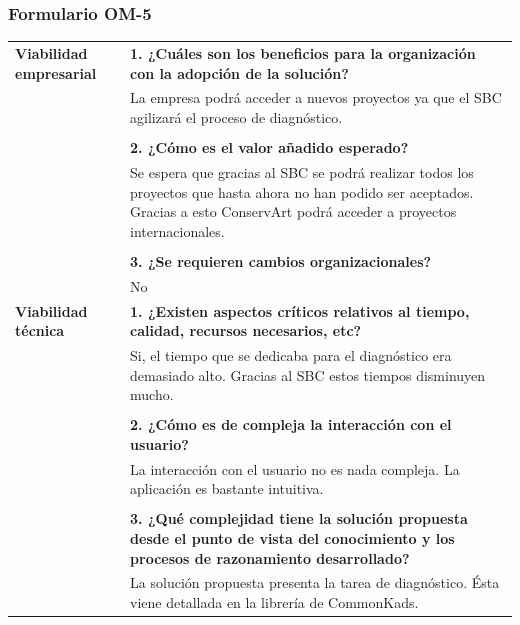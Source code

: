 \documentclass[a4paper,11pt]{article}
\begin{document}
			\subsubsection{Formulario OM-5}
			\begin{center}
				\begin{tabular}{| p{4.5cm} | p{7cm} |}
					\hline
					\cellcolor[RGB]{224,233,250}\textbf{Viabilidad empresarial} & 
					\textbf{1. ¿Cuáles son los beneficios para la organización con la adopción
					de la solución?}\\
					\cellcolor[RGB]{224,233,250}& La empresa podrá acceder a nuevos proyectos
					ya que el SBC agilizará el proceso de diagnóstico.\\
					\cellcolor[RGB]{224,233,250}& \\
					\cellcolor[RGB]{224,233,250}& \textbf{2. ¿Cómo es el valor añadido
					esperado?}\\
					\cellcolor[RGB]{224,233,250}& Se espera que gracias al SBC se podrá
					realizar todos los proyectos que hasta ahora no han podido ser aceptados. Gracias a esto ConservArt podrá acceder a proyectos internacionales.\\
					\cellcolor[RGB]{224,233,250}& \\
					\cellcolor[RGB]{224,233,250}& \textbf{3. ¿Se requieren cambios
					organizacionales?}\\
					\cellcolor[RGB]{224,233,250}& No\\
					\hline
					\cellcolor[RGB]{224,233,250}\textbf{Viabilidad técnica} & 
					\textbf{1. ¿Existen aspectos críticos relativos al tiempo, calidad,
					recursos necesarios, etc?}\\
					\cellcolor[RGB]{224,233,250}& Si, el tiempo que se dedicaba para el
					diagnóstico era demasiado alto.
					Gracias al SBC estos tiempos disminuyen mucho.\\
					\cellcolor[RGB]{224,233,250}& \\
					\cellcolor[RGB]{224,233,250}& \textbf{2. ¿Cómo es de compleja la
					interacción con el usuario?}\\
					\cellcolor[RGB]{224,233,250}& La interacción con el usuario no es nada
					compleja. La aplicación es bastante intuitiva.\\
					\cellcolor[RGB]{224,233,250}& \\
					\cellcolor[RGB]{224,233,250}& \textbf{3. ¿Qué complejidad tiene la solución
					propuesta desde el punto de vista del conocimiento y los procesos de razonamiento desarrollado?}\\
					\cellcolor[RGB]{224,233,250}& La solución propuesta presenta la tarea de
					diagnóstico.
					Ésta viene detallada en la librería de CommonKads.\\
					\hline
				\end{tabular}
			\end{center}
\end{document}
